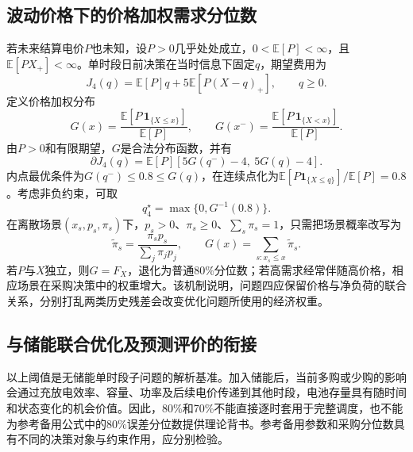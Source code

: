 \subsection{波动价格下的价格加权需求分位数}

若未来结算电价$P$也未知，设$P>0$几乎处处成立，$0<\mathbb E[P]<\infty$，且$\mathbb E[PX_+]<\infty$。单时段日前决策在当时信息下固定$q$，期望费用为
\begin{equation}
 J_4(q)=\mathbb E[P]q+5\mathbb E[P(X-q)_+],\qquad q\ge0.
 \label{eq:mech_q4_cost}
\end{equation}
定义价格加权分布
\begin{equation}
 G(x)=\frac{\mathbb E[P\,\mathbf 1_{\{X\le x\}}]}{\mathbb E[P]},\qquad
 G(x^-)=\frac{\mathbb E[P\,\mathbf 1_{\{X<x\}}]}{\mathbb E[P]}.
 \label{eq:mech_weighted_cdf}
\end{equation}
由$P>0$和有限期望，$G$是合法分布函数，并有
\begin{equation}
 \partial J_4(q)=\mathbb E[P][5G(q^-)-4,\ 5G(q)-4].
 \label{eq:mech_q4_subgradient}
\end{equation}
内点最优条件为$G(q^-)\le0.8\le G(q)$，在连续点化为$\mathbb E[P\mathbf 1_{\{X\le q\}}]/\mathbb E[P]=0.8$。考虑非负约束，可取
\begin{equation}
 q_4^\star=\max\{0,G^{-1}(0.8)\}.
 \label{eq:mech_weighted_quantile}
\end{equation}
在离散场景$(x_s,p_s,\pi_s)$下，$p_s>0$、$\pi_s\ge0$、$\sum_s\pi_s=1$，只需把场景概率改写为
\begin{equation}
 \widetilde\pi_s=\frac{\pi_sp_s}{\sum_j\pi_jp_j},\qquad
 G(x)=\sum_{s:x_s\le x}\widetilde\pi_s.
 \label{eq:mech_scenario_reweight}
\end{equation}
若$P$与$X$独立，则$G=F_X$，退化为普通80\%分位数；若高需求经常伴随高价格，相应场景在采购决策中的权重增大。该机制说明，问题四应保留价格与净负荷的联合关系，分别打乱两类历史残差会改变优化问题所使用的经济权重。

\subsection{与储能联合优化及预测评价的衔接}

以上阈值是无储能单时段子问题的解析基准。加入储能后，当前多购或少购的影响会通过充放电效率、容量、功率及后续电价传递到其他时段，电池存量具有随时间和状态变化的机会价值。因此，80\%和70\%不能直接逐时套用于完整调度，也不能为参考备用公式中的80\%误差分位数提供理论背书。参考备用参数和采购分位数具有不同的决策对象与约束作用，应分别检验。

